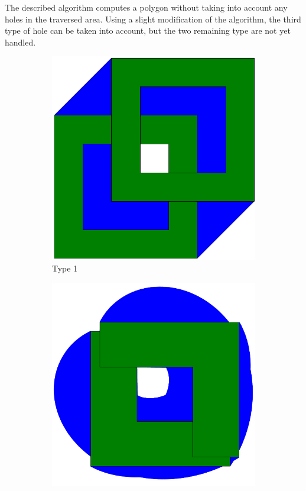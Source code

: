 The described algorithm computes a polygon without taking into account any holes in the traversed area. Using a slight modification of the algorithm, the third type of hole can be taken into account, but the two remaining type are not yet handled.

\begin{figure}[h!]
    \centering
    \begin{subfigure}{.3\textwidth}
        \centering
        \includegraphics[width=\textwidth]{images/hole_1.pdf}
        \caption{Type 1}
        \label{fig:hole_type_1}
    \end{subfigure}
    \hfill
    \begin{subfigure}{.3\textwidth}
        \centering
        \includegraphics[width=\textwidth]{images/hole_2.pdf}

\end{subfigure}
\end{figure}
